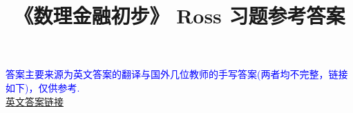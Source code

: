 \documentclass[UTF8]{ctexart}
\title{\Large\heiti 《数理金融初步》 Ross 习题参考答案\vspace{-3em}}
\date{}
\begin{document}
    \maketitle
    \begin{center}
        {{\kaishu \textcolor{blue}{答案主要来源为英文答案的翻译与国外几位教师的手写答案(两者均不完整，链接如下)，仅供参考.}}}\\
        \href{http://pan-yz.chaoxing.com/pcNote/openFolder?resid=676853640652390400&puid=103416764}{英文答案链接}
    \end{center}
    \tableofcontents
    \clearpage
    
    
    
    
    
    
    
    
    
    
    
    
    
    
    
\end{document}
